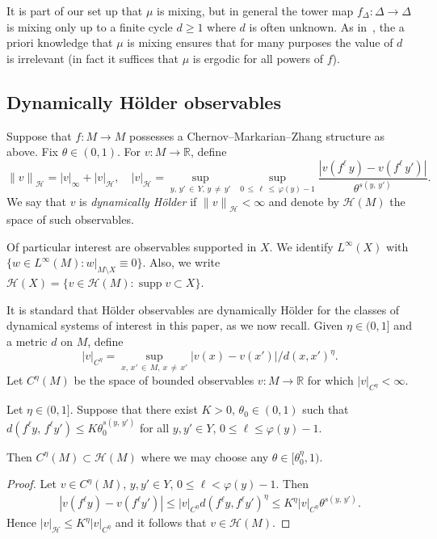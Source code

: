 \documentclass[AHL,Unicode,longabstracts,published]{cedram}
\newcommand{\R}{\mathbb{R}}
\newcommand{\cH}{\mathcal{H}}
\DeclareMathOperator{\supp}{supp}
\begin{document}
\begin{rema}\label{rmk:d}
It is part of our set up that $\mu$ is mixing, but in general the tower map $f_\Delta:\Delta\to\Delta$ is mixing only up to a finite cycle $d\ge1$ where $d$ is often unknown. As in~\cite[Theorem~2.1, Proposition~10.1]{Chernov99}, the a priori knowledge that $\mu$ is mixing ensures that for many purposes the value of $d$ is irrelevant (in fact it suffices that $\mu$ is ergodic for all powers of $f$).
\end{rema}

\subsection{Dynamically H\"older observables}

Suppose that $f:M\to M$ possesses a Chernov--Markarian--Zhang structure as above. Fix $\theta\in(0,1)$. For $v:M\to\R$, define
\begin{equation}\label{eq:dyn}
{\|v\|}_\cH=|v|_\infty+{|v|}_\cH, \quad {|v|}_\cH=\sup_{y,\,y'\,\in\,Y,\,y\,\neq\,y'}\;\sup_{0\,\le\,\ell\,\le\,\varphi(y)-1}\frac{|v(f^\ell\,y)-v(f^\ell\,y')|}{\theta^{s(y,\,y')}}.
\end{equation}
We say that $v$ is \emph{dynamically H\"older} if ${\|v\|}_\cH<\infty$ and denote by $\cH(M)$ the space of such observables.


Of particular interest are observables supported in $X$. We identify $L^\infty(X)$ with $\{w\in L^\infty(M):w|_{M\setminus X}\equiv0\}$. Also, we write $\cH(X)=\{v\in \cH(M):\supp v\subset X\}$.

It is standard that H\"older observables are dynamically H\"older for the classes of dynamical systems of interest in this paper, as we now recall. Given $\eta\in(0,1]$ and a metric $d$ on $M$, define
\[
{|v|}_{C^\eta}=\sup_{x,\,x'\,\in\,M,\,x\,\neq\,x'}|v(x)-v(x')|/d(x,x')^\eta.
\]
Let $C^\eta(M)$ be the space of bounded observables $v:M\to\R$ for which ${|v|}_{C^\eta}<\infty$.

\begin{prop}\label{prop:dyn}
Let $\eta\in(0,1]$. Suppose that there exist $K>0$, $\theta_0\in(0,1)$ such that $d(f^\ell y,\,f^\ell y')\le K\theta_0^{s(y,\,y')}$ for all $y,y'\in Y$, $0\le\ell\le \varphi(y)-1$.

Then $C^\eta(M)\subset \cH(M)$ where we may choose any $\theta\in[\theta_0^\eta,1)$.
\end{prop}

\begin{proof}
Let $v\in C^\eta(M)$, $y,y'\in Y$, $0\le\ell<\varphi(y)-1$. Then
\begin{align*}
\left|v\left(f^\ell y\right)- v\left(f^\ell y'\right)\right|
\le {|v|}_{C^\eta}d\left(f^\ell y,f^\ell y'\right)^\eta
\le K^\eta {|v|}_{C^\eta} \theta^{s(y,\,y')}.
\end{align*}
Hence ${|v|}_{\cH}\le K^\eta {|v|}_{C^\eta}$ and it follows that $v\in \cH(M)$.
\end{proof}
\end{document}
